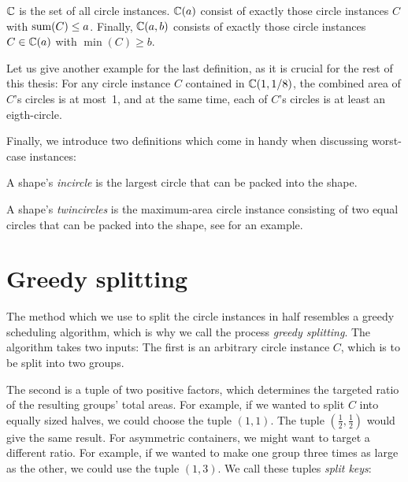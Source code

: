 \documentclass[a4paper,style=print,oneside,bibliography=totoc,nexus,lnum,extramargin]{tubsbook}
\begin{document}
\begin{definition}
    $\mathbb{C}$ is the set of all circle instances. $\mathbb{C}(a)$ consist of exactly those circle instances $C$ with $\operatorname{sum}(C) \le a$. Finally, $\mathbb{C}(a,b)$ consists of exactly those circle instances $C \in \mathbb{C}(a)$ with $\min(C) \ge b$.
\end{definition}

Let us give another example for the last definition, as it is crucial for the rest of this thesis: For any circle instance $C$ contained in $\mathbb{C}(1,1/8)$, the combined area of $C$'s circles is at most~1, and at the same time, each of $C$'s circles is at least an eigth-circle.

Finally, we introduce two definitions which come in handy when discussing worst-case instances:

\begin{definition}
    A shape's \emph{incircle} is the largest circle that can be packed into the shape.
\end{definition}

\begin{definition}
    A shape's \emph{twincircles} is the maximum-area circle instance consisting of two equal circles that can be packed into the shape, see  for an example.%
\end{definition}


\section{Greedy splitting}

The method which we use to split the circle instances in half resembles a greedy scheduling algorithm, which is why we call the process \emph{greedy splitting}. The algorithm takes two inputs: The first is an arbitrary circle instance $C$, which is to be split into two groups.

The second is a tuple of two positive factors, which determines the targeted ratio of the resulting groups' total areas. For example, if we wanted to split $C$ into equally sized halves, we could choose the tuple $(1,1)$. The tuple $(\frac 1 2,\frac 1 2)$ would give the same result.
For asymmetric containers, we might want to target a different ratio. For example, if we wanted to make one group three times as large as the other, we could use the tuple $(1,3)$. We call these tuples \emph{split keys}:
\end{document}
